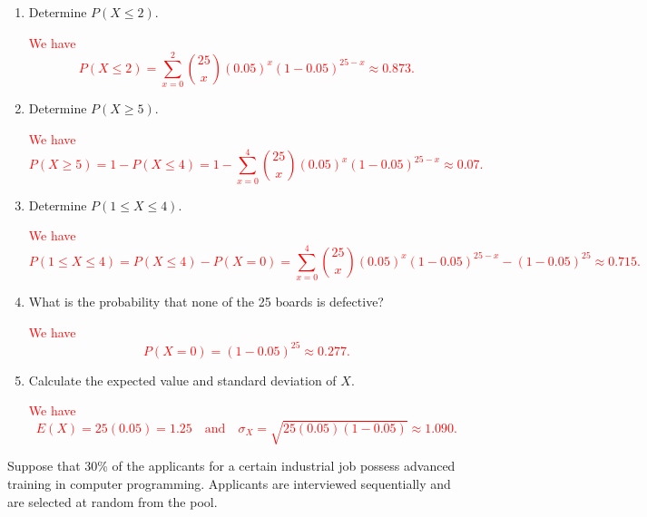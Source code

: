 \documentclass[12pt,reqno]{amsart}
\begin{document}
\medskip
\begin{enumerate}
\item Determine $P(X\leq 2)$.

\bigskip
\textcolor{red}{We have
	\[P(X\leq 2) = \sum_{x=0}^2 \binom{25}{x} (0.05)^x (1-0.05)^{25-x} \approx 0.873.
	\]}
\bigskip

\item Determine $P(X\geq 5)$.

\bigskip
\textcolor{red}{We have
	\[P(X\geq 5) = 1 - P(X \leq 4) = 1 - \sum_{x=0}^4 \binom{25}{x} (0.05)^x (1-0.05)^{25-x} \approx 0.07.
	\]}
\bigskip

\item Determine $P(1\leq X \leq 4)$.

\bigskip
\textcolor{red}{We have
	\[P(1\leq X \leq 4) =  P(X \leq 4) - P(X = 0) = \sum_{x=0}^4 \binom{25}{x} (0.05)^x (1-0.05)^{25-x} - (1-0.05)^{25} \approx 0.715.
	\]}
\bigskip

\item What is the probability that none of the 25 boards is defective?

\bigskip
\textcolor{red}{We have
	\[P(X = 0) = (1-0.05)^{25} \approx 0.277.
	\]}
\bigskip

\item Calculate the expected value and standard deviation of $X$.

\bigskip
\textcolor{red}{We have
	\[E(X) = 25(0.05) = 1.25 \quad \text{and} \quad \sigma_X = \sqrt{25(0.05)(1-0.05)} \approx 1.090.
	\]}
\end{enumerate}












\bigskip
\prob Suppose that 30\% of the applicants for a certain industrial job possess advanced training in computer programming. Applicants are interviewed sequentially and are selected at random from the pool.
\end{document}
